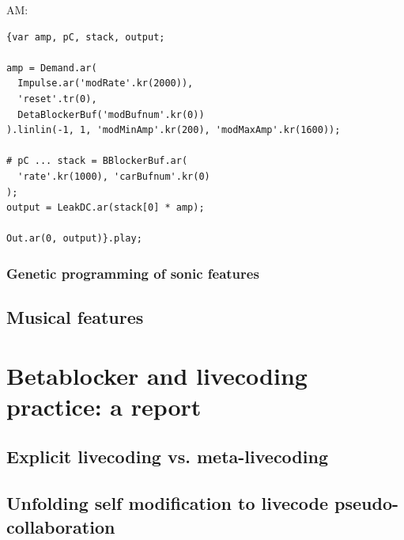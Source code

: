 \documentclass[letterpaper, 12pt]{article}
\begin{document}
AM:
\begin{Verbatim}[fontfamily=courier, xleftmargin=\parindent]
{var amp, pC, stack, output;

amp = Demand.ar(
  Impulse.ar('modRate'.kr(2000)), 
  'reset'.tr(0),
  DetaBlockerBuf('modBufnum'.kr(0))
).linlin(-1, 1, 'modMinAmp'.kr(200), 'modMaxAmp'.kr(1600));

# pC ... stack = BBlockerBuf.ar(
  'rate'.kr(1000), 'carBufnum'.kr(0)
);
output = LeakDC.ar(stack[0] * amp);

Out.ar(0, output)}.play;
\end{Verbatim}







\subsubsection{Genetic programming of sonic features} %
\label{sub:genetic_programming_of_sonic_features}


\subsection{Musical features} 
\label{sub:musical_features}



\section{Betablocker and livecoding practice: a report} 
\label{sec:betablocker_and_livecoding_practice_a_report}

\subsection{Explicit livecoding vs. meta-livecoding} 
\label{sub:explicit_livecoding_}



\subsection{Unfolding self modification to livecode pseudo-collaboration} 
\label{sec:unfolding_self_modification_to_livecode_collaboration}
\end{document}
